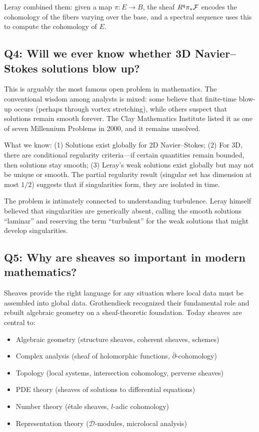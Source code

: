 Leray combined them: given a map $\pi: E \to B$, the sheaf $R^q\pi_*\mathcal{F}$ encodes the cohomology of the fibers varying over the base, and a spectral sequence uses this to compute the cohomology of $E$.

\subsection*{Q4: Will we ever know whether 3D Navier--Stokes solutions blow up?}

This is arguably the most famous open problem in mathematics. The conventional wisdom among analysts is mixed: some believe that finite-time blow-up occurs (perhaps through vortex stretching), while others suspect that solutions remain smooth forever. The Clay Mathematics Institute listed it as one of seven Millennium Problems in 2000, and it remains unsolved.

What we know: (1) Solutions exist globally for 2D Navier--Stokes; (2) For 3D, there are conditional regularity criteria---if certain quantities remain bounded, then solutions stay smooth; (3) Leray's weak solutions exist globally but may not be unique or smooth. The partial regularity result (singular set has dimension at most $1/2$) suggests that if singularities form, they are isolated in time.

The problem is intimately connected to understanding turbulence. Leray himself believed that singularities are generically absent, calling the smooth solutions ``laminar'' and reserving the term ``turbulent'' for the weak solutions that might develop singularities.

\subsection*{Q5: Why are sheaves so important in modern mathematics?}

Sheaves provide the right language for any situation where local data must be assembled into global data. Grothendieck recognized their fundamental role and rebuilt algebraic geometry on a sheaf-theoretic foundation. Today sheaves are central to:

\begin{itemize}
\item Algebraic geometry (structure sheaves, coherent sheaves, schemes)
\item Complex analysis (sheaf of holomorphic functions, $\bar\partial$-cohomology)
\item Topology (local systems, intersection cohomology, perverse sheaves)
\item PDE theory (sheaves of solutions to differential equations)
\item Number theory (\'{e}tale sheaves, $l$-adic cohomology)
\item Representation theory ($\mathcal{D}$-modules, microlocal analysis)
\end{itemize}

